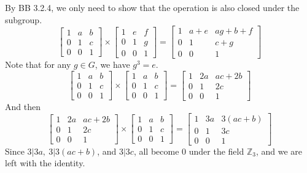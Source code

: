 \documentclass[letterpaper]{article}
\newcommand{\Integers}{\mathbb{Z}}
\begin{document}
\begin{itemize}
            By BB 3.2.4, we only need to show that the operation is also closed under the subgroup. \[
                  \begin{bmatrix}
                        1 & a & b \\
                        0 & 1 & c \\
                        0 & 0 & 1
                  \end{bmatrix} \times \begin{bmatrix}
                        1 & e & f \\
                        0 & 1 & g \\
                        0 & 0 & 1
                  \end{bmatrix} = \begin{bmatrix}
                        1 & a + e & ag + b + f \\
                        0 & 1     & c+g        \\
                        0 & 0     & 1
                  \end{bmatrix}
            \]
            Note that for any \(g \in G\), we have \(g^3 = e\).
            \[\begin{bmatrix}
                        1 & a & b \\
                        0 & 1 & c \\
                        0 & 0 & 1
                  \end{bmatrix} \times \begin{bmatrix}
                        1 & a & b \\
                        0 & 1 & c \\
                        0 & 0 & 1
                  \end{bmatrix} = \begin{bmatrix}
                        1 & 2a & ac+2b \\
                        0 & 1  & 2c    \\
                        0 & 0  & 1
                  \end{bmatrix}\]
            And then \[\begin{bmatrix}
                        1 & 2a & ac+2b \\
                        0 & 1  & 2c    \\
                        0 & 0  & 1
                  \end{bmatrix} \times \begin{bmatrix}
                        1 & a & b \\
                        0 & 1 & c \\
                        0 & 0 & 1
                  \end{bmatrix} = \begin{bmatrix}
                        1 & 3a & 3(ac+b) \\
                        0 & 1  & 3c      \\
                        0 & 0  & 1
                  \end{bmatrix}\]
            Since \(3 | 3a,\ 3|3(ac+b)\), and \(3|3c\), all become 0 under the field \(\Integers_3\), and we are left with the identity.


\end{itemize}
\end{document}
